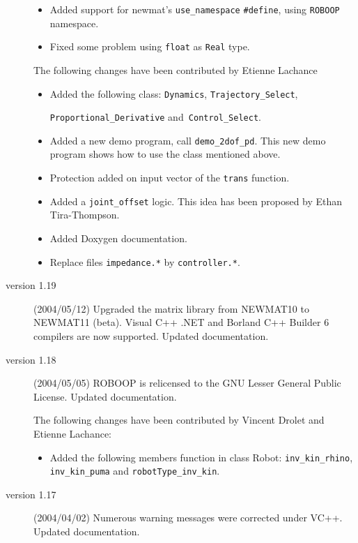 \documentclass[dvips,11pt,fleqn]{report}
\begin{document}
\begin{description}
  \begin{itemize}
  \item Added support for newmat's \texttt{use\_namespace}
    \texttt{\#define}, using \texttt{ROBOOP} namespace.
  \item Fixed some problem using \texttt{float} as \texttt{Real} type.
  \end{itemize}

  The following changes have been contributed by Etienne Lachance

  \begin{itemize}
  \item Added the following class: \texttt{Dynamics},
    \texttt{Trajectory\_Select}, \par \texttt{Proportional\_Derivative}
    and\texttt{ Control\_Select}.
  \item Added a new demo program, call \texttt{demo\_2dof\_pd}. This
    new demo program shows how to use the class mentioned above.
  \item Protection added on input vector of the \texttt{trans}
    function.
  \item Added a \texttt{joint\_offset} logic. This idea has been
    proposed by Ethan Tira-Thompson.
  \item Added \textsf{Doxygen} documentation.
  \item Replace files \texttt{impedance.*} by \texttt{controller.*}.
  \end{itemize}


\item[version 1.19] (2004/05/12) Upgraded the matrix library from
  \textsf{NEWMAT10} to \textsf{NEWMAT11 (beta)}. \textsf{Visual C++
    .NET} and \textsf{Borland C++ Builder 6} compilers are now
  supported. Updated documentation.

\item[version 1.18] (2004/05/05) \textsf{ROBOOP} is relicensed to the
  GNU Lesser General Public License. Updated documentation.

  The following changes have been contributed by Vincent Drolet and
  Etienne Lachance:
  \begin{itemize}
  \item Added the following members function in class Robot:
    \texttt{inv\_kin\_rhino}, \texttt{inv\_kin\_puma} and
    \texttt{robotType\_inv\_kin}.
  \end{itemize}

\item[version 1.17] (2004/04/02) Numerous warning messages were
  corrected under \textsf{VC++}. Updated documentation.


\end{description}
\end{document}
